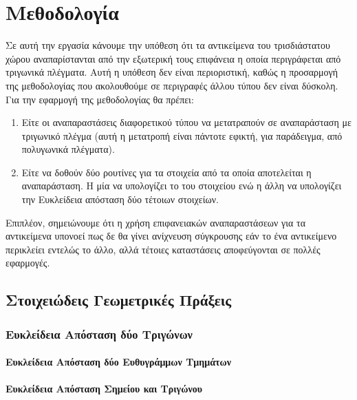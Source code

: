 \chapter{Μεθοδολογία}
\label{ch:methodology}

Σε αυτή την εργασία κάνουμε την υπόθεση ότι τα αντικείμενα του 
τρισδιάστατου χώρου αναπαρίστανται από την εξωτερική τους επιφάνεια 
η οποία περιγράφεται από τριγωνικά πλέγματα. 
Αυτή η υπόθεση δεν είναι περιοριστική, καθώς η προσαρμογή της μεθοδολογίας 
που ακολουθούμε σε περιγραφές άλλου τύπου δεν είναι δύσκολη.
Για την εφαρμογή της μεθοδολογίας θα πρέπει:
\begin{enumerate}
    \item Είτε οι αναπαραστάσεις διαφορετικού τύπου να μετατραπούν σε αναπαράσταση 
    με τριγωνικό πλέγμα (αυτή η μετατροπή είναι πάντοτε εφικτή, για παράδειγμα, 
    από πολυγωνικά πλέγματα).
    \item Είτε να δοθούν δύο ρουτίνες για τα στοιχεία από τα οποία αποτελείται η 
    αναπαράσταση. Η μία να υπολογίζει το  του στοιχείου 
    ενώ η άλλη να υπολογίζει την Ευκλείδεια απόσταση δύο τέτοιων στοιχείων.
\end{enumerate}
Επιπλέον, σημειώνουμε ότι η χρήση επιφανειακών αναπαραστάσεων για τα αντικείμενα 
υπονοεί πως δε θα γίνει ανίχνευση σύγκρουσης εάν το ένα αντικείμενο περικλείει 
εντελώς το άλλο, αλλά τέτοιες καταστάσεις αποφεύγονται σε πολλές εφαρμογές.


\section{Στοιχειώδεις Γεωμετρικές Πράξεις}
\subsection{Ευκλείδεια Απόσταση δύο Τριγώνων}
\label{subsec:tria_distance}


\subsubsection{Ευκλείδεια Απόσταση δύο Ευθυγράμμων Τμημάτων}
\subsubsection{Ευκλείδεια Απόσταση Σημείου και Τριγώνου}

